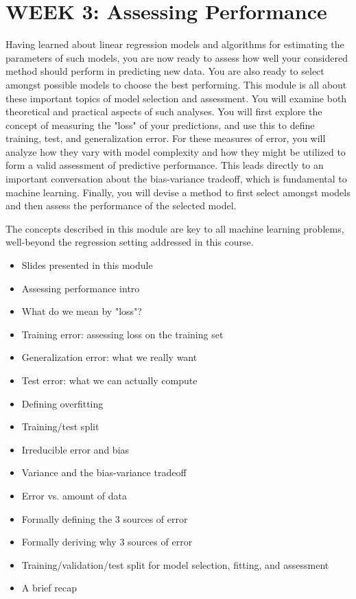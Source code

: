 \section*{WEEK 3: Assessing Performance}
Having learned about linear regression models and algorithms for estimating the parameters of such models, you are now ready to assess how well your considered method should perform in predicting new data. You are also ready to select amongst possible models to choose the best performing.
This module is all about these important topics of model selection and assessment. You will examine both theoretical and practical aspects of such analyses. You will first explore the concept of measuring the "loss" of your predictions, and use this to define training, test, and generalization error. For these measures of error, you will analyze how they vary with model complexity and how they might be utilized to form a valid assessment of predictive performance. This leads directly to an important conversation about the bias-variance tradeoff, which is fundamental to machine learning. Finally, you will devise a method to first select amongst models and then assess the performance of the selected model.

The concepts described in this module are key to all machine learning problems, well-beyond the regression setting addressed in this course.
\begin{itemize}
\item Slides presented in this module
\item Assessing performance intro
\item What do we mean by "loss"?
\item Training error: assessing loss on the training set
\item Generalization error: what we really want
\item Test error: what we can actually compute
\item Defining overfitting
\item Training/test split
\item Irreducible error and bias
\item Variance and the bias-variance tradeoff
\item Error vs. amount of data
\item Formally defining the 3 sources of error
\item Formally deriving why 3 sources of error
\item Training/validation/test split for model selection, fitting, and assessment
\item A brief recap
\end{itemize}


